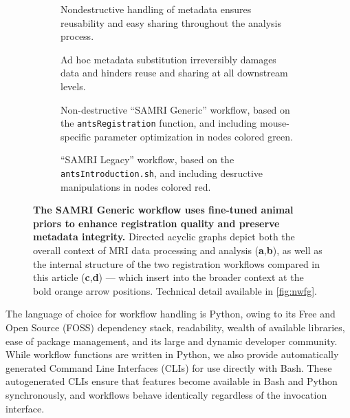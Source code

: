 \begin{figure*}[h!]
	\vspace{-1.8em}
	\begin{subfigure}{\textwidth}
		\centering
		\vspace{-3em}
		\caption{
			Nondestructive handling of metadata ensures reusability and easy sharing throughout the analysis process.
			}
		\label{fig:mdg}
	\vspace{-0.3em}
	\end{subfigure}
	\begin{subfigure}{\textwidth}
		\centering
		\vspace{-3em}
		\caption{
			Ad hoc metadata substitution irreversibly damages data and hinders reuse and sharing at all downstream levels.
			}
		\label{fig:mdb}
	\vspace{-0.5em}
	\end{subfigure}
	\begin{subfigure}{.58\textwidth}
		\centering
		\vspace{-2.1em}
		\caption{
			Non-destructive “SAMRI Generic” workflow, based on the \textcolor{mg}{\texttt{antsRegistration}} function, and including mouse-specific parameter optimization in nodes colored green.
			}
		\label{fig:wfgg}
	\end{subfigure}\hfill
	\begin{subfigure}{.39\textwidth}
		\centering
		\vspace{-0.8em}
		\caption{
			“SAMRI Legacy” workflow, based on the \textcolor{mg}{\texttt{antsIntroduction.sh}}, and including desructive manipulations in nodes colored red.
			}
		\label{fig:wfgl}
	\end{subfigure}
	\caption{
		\textbf{The SAMRI Generic workflow uses fine-tuned animal priors to enhance registration quality and preserve metadata integrity.}
		Directed acyclic graphs depict both the overall context of MRI data processing and analysis (\textbf{a},\textbf{b}), as well as the internal structure of the two registration workflows compared in this article (\textbf{c},\textbf{d}) --- which insert into the broader context at the bold orange arrow positions.
		Technical detail available in \cref{fig:nwfg}.
		}
	\label{fig:wfg}
\end{figure*}

The language of choice for workflow handling is Python, owing to its Free and Open Source (FOSS) dependency stack, readability, wealth of available libraries, ease of package management, and its large and dynamic developer community.
While workflow functions are written in Python, we also provide automatically generated Command Line Interfaces (CLIs) for use directly with Bash.
These autogenerated CLIs ensure that features become available in Bash and Python synchronously, and workflows behave identically regardless of the invocation interface.

